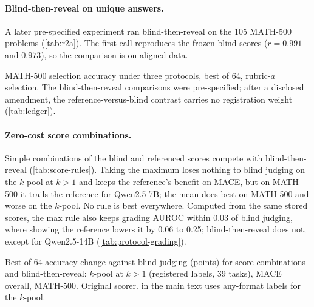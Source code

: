 \paragraph{Blind-then-reveal on unique answers.}
A later pre-specified experiment ran blind-then-reveal on the 105 MATH-500 problems (\cref{tab:r2a}). The first call reproduces the frozen blind scores ($r=0.991$ and $0.973$), so the comparison is on aligned data.

\begin{table}[htbp]
\centering
\caption{MATH-500 selection accuracy under three protocols, best of 64, rubric-$a$ selection. The blind-then-reveal comparisons were pre-specified; after a disclosed amendment, the reference-versus-blind contrast carries no registration weight (\cref{tab:ledger}).}
\label{tab:r2a}
\footnotesize
\begin{adjustbox}{max width=\linewidth}\end{adjustbox}

\end{table}

\paragraph{Zero-cost score combinations.}
Simple combinations of the blind and referenced scores compete with blind-then-reveal (\cref{tab:score-rules}). Taking the maximum loses nothing to blind judging on the $k$-pool at $k{>}1$ and keeps the reference's benefit on \textsc{MACE}, but on MATH-500 it trails the reference for Qwen2.5-7B; the mean does best on MATH-500 and worse on the $k$-pool. No rule is best everywhere. Computed from the same stored scores, the max rule also keeps grading AUROC within 0.03 of blind judging, where showing the reference lowers it by 0.06 to 0.25; blind-then-reveal does not, except for Qwen2.5-14B (\cref{tab:protocol-grading}).\ph

\begin{table}[htbp]
\centering
\footnotesize
\caption{Best-of-64 accuracy change against blind judging (points) for score combinations and blind-then-reveal: $k$-pool at $k{>}1$ (registered labels, 39 tasks), \textsc{MACE} overall, MATH-500. Original scorer.  in the main text uses any-format labels for the $k$-pool.\ph}
\label{tab:score-rules}
\begin{adjustbox}{max width=\linewidth}\end{adjustbox}
\end{table}

